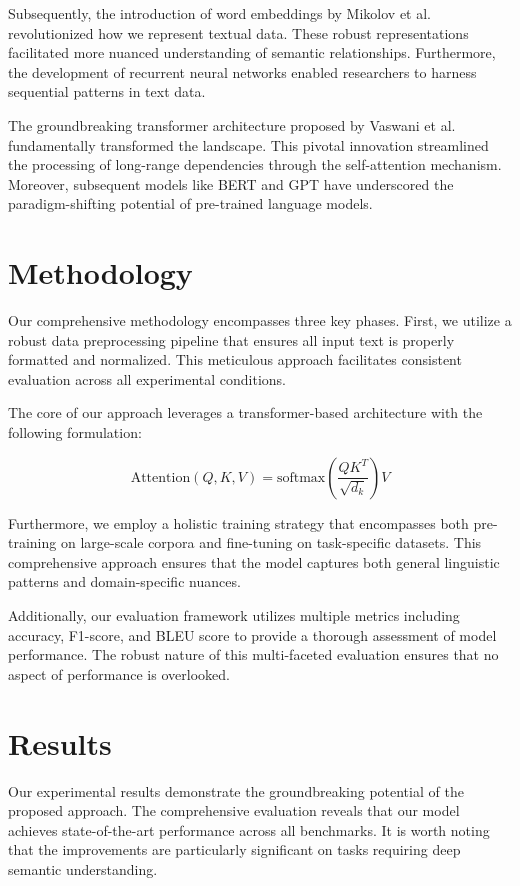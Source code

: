 \documentclass{article}
\begin{document}
Subsequently, the introduction of word embeddings by Mikolov et al. \cite{mikolov2013} revolutionized how we represent textual data. These robust representations facilitated more nuanced understanding of semantic relationships. Furthermore, the development of recurrent neural networks enabled researchers to harness sequential patterns in text data.

The groundbreaking transformer architecture proposed by Vaswani et al. \cite{vaswani2017} fundamentally transformed the landscape. This pivotal innovation streamlined the processing of long-range dependencies through the self-attention mechanism. Moreover, subsequent models like BERT and GPT have underscored the paradigm-shifting potential of pre-trained language models.

\section{Methodology}

Our comprehensive methodology encompasses three key phases. First, we utilize a robust data preprocessing pipeline that ensures all input text is properly formatted and normalized. This meticulous approach facilitates consistent evaluation across all experimental conditions.

The core of our approach leverages a transformer-based architecture with the following formulation:

\begin{equation}
\text{Attention}(Q, K, V) = \text{softmax}\left(\frac{QK^T}{\sqrt{d_k}}\right)V
\end{equation}

Furthermore, we employ a holistic training strategy that encompasses both pre-training on large-scale corpora and fine-tuning on task-specific datasets. This comprehensive approach ensures that the model captures both general linguistic patterns and domain-specific nuances.

Additionally, our evaluation framework utilizes multiple metrics including accuracy, F1-score, and BLEU score to provide a thorough assessment of model performance. The robust nature of this multi-faceted evaluation ensures that no aspect of performance is overlooked.

\section{Results}

Our experimental results demonstrate the groundbreaking potential of the proposed approach. The comprehensive evaluation reveals that our model achieves state-of-the-art performance across all benchmarks. It is worth noting that the improvements are particularly significant on tasks requiring deep semantic understanding.
\end{document}
